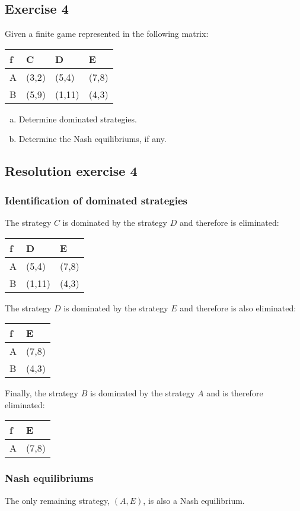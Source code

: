 \documentclass[\main/main.tex]{subfiles}
\begin{document}
\subsection{Exercise 4}
Given a finite game represented in the following matrix:

\begin{table}
  \begin{tabular}{L|LLL}
    f & C     & D      & E     \\
    \hline
    A & (3,2) & (5,4)  & (7,8) \\
    B & (5,9) & (1,11) & (4,3)
  \end{tabular}
\end{table}

\begin{enumerate}[a)]
  \item Determine dominated strategies.
  \item Determine the Nash equilibriums, if any.
\end{enumerate}

\subsection{Resolution exercise 4}
\subsubsection*{Identification of dominated strategies}

The strategy $C$ is dominated by the strategy $D$ and therefore is eliminated:

\begin{table}
  \begin{tabular}{L|LL}
    f & D      & E     \\
    \hline
    A & (5,4)  & (7,8) \\
    B & (1,11) & (4,3)
  \end{tabular}
\end{table}

The strategy $D$ is dominated by the strategy $E$ and therefore is also eliminated:

\begin{table}
  \begin{tabular}{L|L}
    f & E     \\
    \hline
    A & (7,8) \\
    B & (4,3)
  \end{tabular}
\end{table}

Finally, the strategy $B$ is dominated by the strategy $A$ and is therefore eliminated:

\begin{table}
  \begin{tabular}{L|L}
    f & E     \\
    \hline
    A & (7,8) \\
  \end{tabular}
\end{table}


\subsubsection*{Nash equilibriums}
The only remaining strategy, $(A,E)$, is also a Nash equilibrium.
\end{document}
